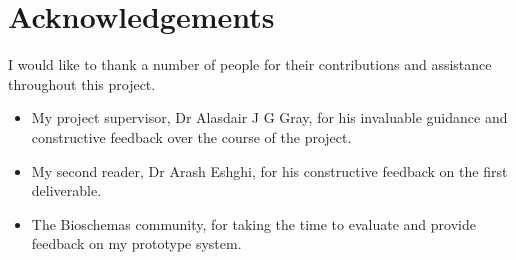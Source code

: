 \chapter*{Acknowledgements}
I would like to thank a number of people for their contributions and assistance throughout this project.

\begin{itemize}
\item My project supervisor, Dr Alasdair J G Gray, for his invaluable guidance and constructive feedback over the course of the project.
\item My second reader, Dr Arash Eshghi, for his constructive feedback on the first deliverable.
\item The Bioschemas community, for taking the time to evaluate and provide feedback on my prototype system.
\end{itemize}
